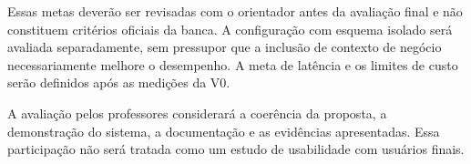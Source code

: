 Essas metas deverão ser revisadas com o orientador antes da avaliação final e não constituem critérios oficiais da banca. A configuração com esquema isolado será avaliada separadamente, sem pressupor que a inclusão de contexto de negócio necessariamente melhore o desempenho. A meta de latência e os limites de custo serão definidos após as medições da V0.

A avaliação pelos professores considerará a coerência da proposta, a demonstração do sistema, a documentação e as evidências apresentadas. Essa participação não será tratada como um estudo de usabilidade com usuários finais.


